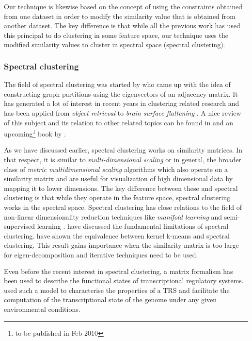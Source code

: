 Our technique is likewise based on the concept of using the constraints obtained from one dataset in order to modify the similarity value that is obtained from another dataset. The key difference is that while all the previous work has used this principal to do clustering in some feature space, our technique uses the modified similarity values to cluster in spectral space (spectral clustering). 

\subsubsection{Spectral clustering}
The field of spectral clustering was started by \citet{donath1973lower} who came up with the idea of constructing graph partitions using the eigenvectors of an adjacency matrix. It has generated a lot of interest in recent years \citep{shi00normalized,ng2001onspectral} in clustering related research and has been applied from \textit{object retrieval} \citep{jain06spectral} to \textit{brain surface flattening} \citep{angenent99laplace}. A nice review of this subject and its relation to other related topics can be found in \citet{luxberg2006tutorial_spectral} and an upcoming\footnote{to be published in Feb 2010} book by \citet{ding2008spectral}.

As we have discussed earlier, spectral clustering works on similarity matrices. In that respect, it is similar to \textit{multi-dimensional scaling} or in general, the broader class of \textit{metric multidimensional scaling} \citep{deleeuw2005mds} algorithms which also operate on a similarity matrix and are useful for visualization of high dimensional data by mapping it to lower dimensions. The key difference between these and spectral clustering is that while they operate in the feature space, spectral clustering works in the spectral space. Spectral clustering has close relations to the field of non-linear dimensionality reduction techniques like \textit{manifold learning} \citep{saul2006smd, haifang2006manifold} and semi-supervised learning \citep{grira2005unsupsurvey}. \citet{nadler06fundamental} have discussed the fundamental limitations of spectral clustering. \citet{dhillon05unified} have shown the equivalence between kernel k-means \citep{johnshaw2004kernelmethods} and spectral clustering. This result gains importance when the similarity matrix is too large for eigen-decomposition and iterative techniques need to be used. 

Even before the recent interest in spectral clustering, a matrix formalism has been used to describe the functional states of transcriptional regulatory systems. \citet{gianchandani2006matrix} used such a model to characterise the properties of a TRS and facilitate the computation of the transcriptional state of the genome under any given environmental conditions. 

